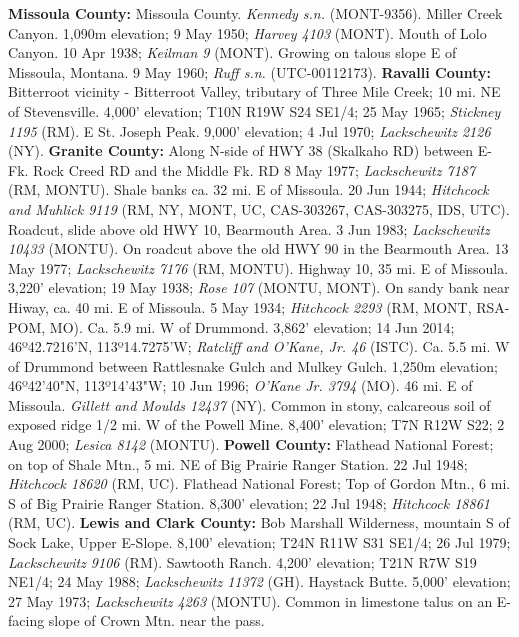   \textbf{Missoula County:}
Missoula County. \textit{Kennedy s.n.} (MONT-9356).
Miller Creek Canyon. 1,090m elevation; 9 May 1950; \textit{Harvey 4103} (MONT).
Mouth of Lolo Canyon. 10 Apr 1938; \textit{Keilman 9} (MONT).
Growing on talous slope E of Missoula, Montana. 9 May 1960;
\textit{Ruff s.n.} (UTC-00112173).
  \textbf{Ravalli County:}
Bitterroot vicinity - Bitterroot Valley, tributary of Three Mile Creek; 10 mi.
NE of Stevensville. 4,000' elevation; T10N R19W S24 SE1/4; 25 May 1965;
\textit{Stickney 1195} (RM).
E St. Joseph Peak. 9,000' elevation; 4 Jul 1970;
\textit{Lackschewitz 2126} (NY).
  \textbf{Granite County:}
Along N-side of HWY 38 (Skalkaho RD) between E-Fk. Rock Creed RD and the Middle
Fk. RD 8 May 1977; \textit{Lackschewitz 7187} (RM, MONTU).
Shale banks ca. 32 mi. E of Missoula. 20 Jun 1944;
\textit{Hitchcock and Muhlick 9119}
(RM, NY, MONT, UC, CAS-303267, CAS-303275, IDS, UTC).
Roadcut, slide above old HWY 10, Bearmouth Area. 3 Jun 1983;
\textit{Lackschewitz 10433} (MONTU).
On roadcut above the old HWY 90 in the Bearmouth Area. 13 May 1977;
\textit{Lackschewitz 7176} (RM, MONTU).
Highway 10, 35 mi. E of Missoula. 3,220' elevation; 19 May 1938;
\textit{Rose 107} (MONTU, MONT).
On sandy bank near Hiway, ca. 40 mi. E of Missoula. 5 May 1934;
\textit{Hitchcock 2293} (RM, MONT, RSA-POM, MO).
Ca. 5.9 mi. W of Drummond. 3,862' elevation; 14 Jun 2014; 46º42.7216'N,
113º14.7275'W; \textit{Ratcliff and O'Kane, Jr. 46} (ISTC).
Ca. 5.5 mi. W of Drummond between Rattlesnake Gulch and Mulkey Gulch. 1,250m
elevation; 46º42'40"N, 113º14'43"W; 10 Jun 1996; \textit{O'Kane Jr. 3794} (MO).
46 mi. E of Missoula. \textit{Gillett and Moulds 12437} (NY).
Common in stony, calcareous soil of exposed ridge 1/2 mi. W of the Powell Mine.
8,400' elevation; T7N R12W S22; 2 Aug 2000; \textit{Lesica 8142} (MONTU).
  \textbf{Powell County:}
Flathead National Forest; on top of Shale Mtn., 5 mi. NE of Big Prairie Ranger
Station. 22 Jul 1948; \textit{Hitchcock 18620} (RM, UC).
Flathead National Forest; Top of Gordon Mtn., 6 mi. S of Big Prairie Ranger
Station. 8,300' elevation; 22 Jul 1948; \textit{Hitchcock 18861} (RM, UC).
  \textbf{Lewis and Clark County:}
Bob Marshall Wilderness, mountain S of Sock Lake, Upper E-Slope.
8,100' elevation; T24N R11W S31 SE1/4; 26 Jul 1979;
\textit{Lackschewitz 9106} (RM).
Sawtooth Ranch. 4,200' elevation; T21N R7W S19 NE1/4; 24 May 1988;
\textit{Lackschewitz 11372} (GH).
Haystack Butte. 5,000' elevation; 27 May 1973;
\textit{Lackschewitz 4263} (MONTU).
Common in limestone talus on an E-facing slope of Crown Mtn. near the pass.
